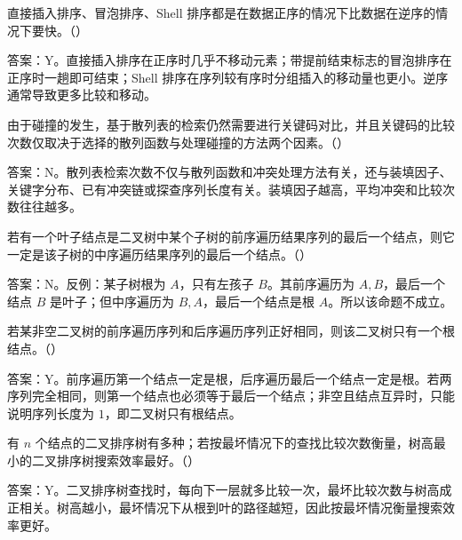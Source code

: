 \begin{question}
直接插入排序、冒泡排序、Shell 排序都是在数据正序的情况下比数据在逆序的情况下要快。（\quad）
\begin{solution}
答案：Y。直接插入排序在正序时几乎不移动元素；带提前结束标志的冒泡排序在正序时一趟即可结束；Shell 排序在序列较有序时分组插入的移动量也更小。逆序通常导致更多比较和移动。
\end{solution}
\end{question}

\begin{question}
由于碰撞的发生，基于散列表的检索仍然需要进行关键码对比，并且关键码的比较次数仅取决于选择的散列函数与处理碰撞的方法两个因素。（\quad）
\begin{solution}
答案：N。散列表检索次数不仅与散列函数和冲突处理方法有关，还与装填因子、关键字分布、已有冲突链或探查序列长度有关。装填因子越高，平均冲突和比较次数往往越多。
\end{solution}
\end{question}

\begin{question}
若有一个叶子结点是二叉树中某个子树的前序遍历结果序列的最后一个结点，则它一定是该子树的中序遍历结果序列的最后一个结点。（\quad）
\begin{solution}
答案：N。反例：某子树根为 $A$，只有左孩子 $B$。其前序遍历为 $A,B$，最后一个结点 $B$ 是叶子；但中序遍历为 $B,A$，最后一个结点是根 $A$。所以该命题不成立。
\end{solution}
\end{question}

\begin{question}
若某非空二叉树的前序遍历序列和后序遍历序列正好相同，则该二叉树只有一个根结点。（\quad）
\begin{solution}
答案：Y。前序遍历第一个结点一定是根，后序遍历最后一个结点一定是根。若两序列完全相同，则第一个结点也必须等于最后一个结点；非空且结点互异时，只能说明序列长度为 $1$，即二叉树只有根结点。
\end{solution}
\end{question}

\begin{question}
有 $n$ 个结点的二叉排序树有多种；若按最坏情况下的查找比较次数衡量，树高最小的二叉排序树搜索效率最好。（\quad）
\begin{solution}
答案：Y。二叉排序树查找时，每向下一层就多比较一次，最坏比较次数与树高成正相关。树高越小，最坏情况下从根到叶的路径越短，因此按最坏情况衡量搜索效率更好。
\end{solution}
\end{question}


